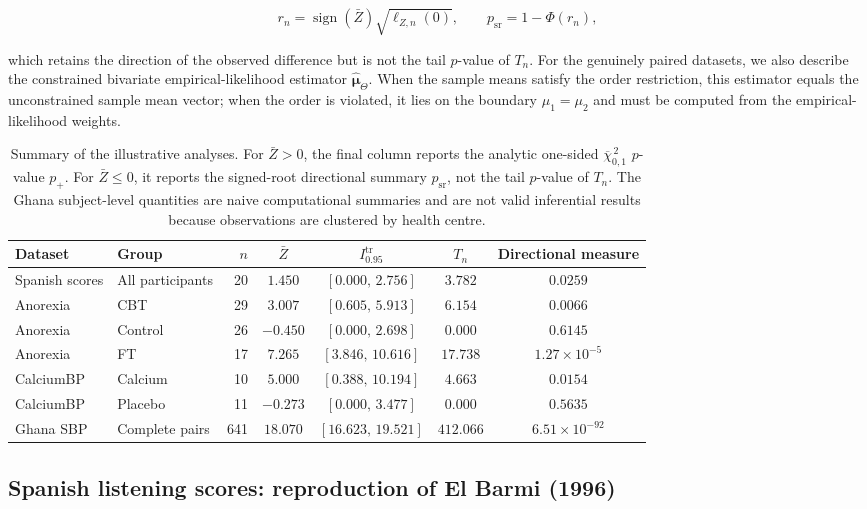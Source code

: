 \documentclass[11pt]{article}
\theoremstyle{remark}
\newcommand{\barchi}[2]{\overline{\chi}^{\,2}_{#1,#2}}
\begin{document}
$$
r_n=\operatorname{sign}(\bar Z)\sqrt{\ell_{Z,n}(0)},
\qquad
p_{\mathrm{sr}}=1-\Phi(r_n),
$$

which retains the direction of the observed difference but is not the tail $p$-value of $T_n$. For the genuinely paired datasets, we also describe the constrained bivariate empirical-likelihood estimator $\widehat{\boldsymbol{\mu}}_{\Theta}$. When the sample means satisfy the order restriction, this estimator equals the unconstrained sample mean vector; when the order is violated, it lies on the boundary $\mu_1=\mu_2$ and must be computed from the empirical-likelihood weights.

\begin{table}[htbp]
\centering
\caption{Summary of the illustrative analyses. For $\bar Z>0$, the final column reports the analytic one-sided $\barchi{0}{1}$ $p$-value $p_+$. For $\bar Z\leq0$, it reports the signed-root directional summary $p_{\mathrm{sr}}$, not the tail $p$-value of $T_n$. The Ghana subject-level quantities are naive computational summaries and are not valid inferential results because observations are clustered by health centre.}
\label{tab:real-data-results}
\small
\begin{tabular}{llrcccc}
\toprule
Dataset & Group & $n$ & $\bar Z$ & $I_{0.95}^{\mathrm{tr}}$ & $T_n$ & Directional measure\\
\midrule
Spanish scores & All participants & 20 & $1.450$ & $[0.000,\,2.756]$ & $3.782$ & $0.0259$\\
Anorexia & CBT & 29 & $3.007$ & $[0.605,\,5.913]$ & $6.154$ & $0.0066$\\
Anorexia & Control & 26 & $-0.450$ & $[0.000,\,2.698]$ & $0.000$ & $0.6145$\\
Anorexia & FT & 17 & $7.265$ & $[3.846,\,10.616]$ & $17.738$ & $1.27\times10^{-5}$\\
CalciumBP & Calcium & 10 & $5.000$ & $[0.388,\,10.194]$ & $4.663$ & $0.0154$\\
CalciumBP & Placebo & 11 & $-0.273$ & $[0.000,\,3.477]$ & $0.000$ & $0.5635$\\
Ghana SBP & Complete pairs & 641 & $18.070$ & $[16.623,\,19.521]$ & $412.066$ & $6.51\times10^{-92}$\\
\bottomrule
\end{tabular}
\end{table}

\subsection{Spanish listening scores: reproduction of El Barmi (1996)}
\end{document}
